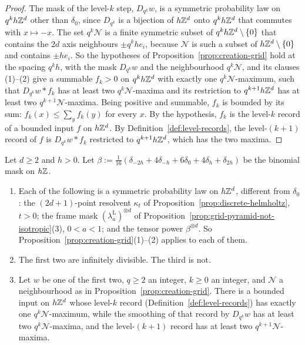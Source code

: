 \begin{proof}
The mask of the level-$k$ step, $D_{q^k}w$, is a symmetric probability law on $q^kh\mathbb{Z}^d$ other
than $\delta_0$, since $D_{q^k}$ is a bijection of $h\mathbb{Z}^d$ onto $q^kh\mathbb{Z}^d$ that commutes with
$x \mapsto -x$. The set $q^k\mathcal{N}$ is a finite symmetric subset of $q^kh\mathbb{Z}^d \setminus \{0\}$
that contains the $2d$ axis neighbours $\pm q^khe_i$, because $\mathcal{N}$ is such a subset of
$h\mathbb{Z}^d \setminus \{0\}$ and contains $\pm he_i$. So the hypotheses of
Proposition~\ref{prop:creation-grid} hold at the spacing $q^kh$, with the mask $D_{q^k}w$ and the
neighbourhood $q^k\mathcal{N}$, and its clauses (1)--(2) give a summable $f_k > 0$ on $q^kh\mathbb{Z}^d$
with exactly one $q^k\mathcal{N}$-maximum,
such that $D_{q^k}w * f_k$ has at least two $q^k\mathcal{N}$-maxima and its restriction to
$q^{k+1}h\mathbb{Z}^d$ has at least two $q^{k+1}\mathcal{N}$-maxima. Being positive and summable, $f_k$ is
bounded by its sum: $f_k(x) \le \sum_yf_k(y)$ for every $x$. By the hypothesis, $f_k$ is the
level-$k$ record of a bounded input $f$ on $h\mathbb{Z}^d$. By Definition~\ref{def:level-records}, the
level-$(k+1)$ record of $f$ is $D_{q^k}w * f_k$ restricted to $q^{k+1}h\mathbb{Z}^d$, which has the two
maxima.
\end{proof}

\begin{proposition}
\label{prop:creation-grid-masks}

Let $d \ge 2$ and $h > 0$. Let $\beta := \tfrac{1}{16}(\delta_{-2h} + 4\delta_{-h} + 6\delta_0 +
4\delta_h + \delta_{2h})$ be the binomial mask on $h\mathbb{Z}$.
\begin{enumerate}
\item Each of the following is a symmetric probability law on $h\mathbb{Z}^d$, different from
$\delta_0$: the $(2d+1)$-point resolvent $\kappa_t$ of
Proposition~\ref{prop:discrete-helmholtz}, $t > 0$; the frame mask
$(\lambda^{\mathrm L}_a)^{\otimes d}$ of Proposition~\ref{prop:grid-pyramid-not-isotropic}(3),
$0 < a < 1$; and the tensor power $\beta^{\otimes d}$. So
Proposition~\ref{prop:creation-grid}(1)--(2) applies to each of them.
\item The first two are infinitely divisible. The third is not.
\item Let $w$ be one of the first two, $q \ge 2$ an integer, $k \ge 0$ an integer, and
$\mathcal{N}$ a neighbourhood as in Proposition~\ref{prop:creation-grid}. There is a bounded input
on $h\mathbb{Z}^d$ whose level-$k$ record (Definition~\ref{def:level-records}) has exactly one $q^k\mathcal{N}$-maximum, while the smoothing of
that record by $D_{q^k}w$ has at least two $q^k\mathcal{N}$-maxima, and the level-$(k+1)$ record
has at least two $q^{k+1}\mathcal{N}$-maxima.
\end{enumerate}
\end{proposition}

